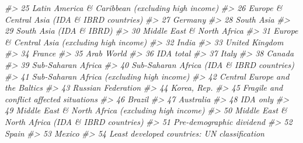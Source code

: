 \documentclass[
  xelatex, ja=standard]{bxjsbook}
\newenvironment{Shaded}{\begin{snugshade}}{\end{snugshade}}
\newcommand{\CommentTok}[1]{\textcolor[rgb]{0.56,0.35,0.01}{\textit{#1}}}
\theoremstyle{definition}
\theoremstyle{definition}
\theoremstyle{definition}
\theoremstyle{definition}
\theoremstyle{remark}
\begin{document}
\begin{Shaded}
\begin{Highlighting}[]
\CommentTok{\#\textgreater{} 25     Latin America \& Caribbean (excluding high income)}
\CommentTok{\#\textgreater{} 26          Europe \& Central Asia (IDA \& IBRD countries)}
\CommentTok{\#\textgreater{} 27                                               Germany}
\CommentTok{\#\textgreater{} 28                                            South Asia}
\CommentTok{\#\textgreater{} 29                               South Asia (IDA \& IBRD)}
\CommentTok{\#\textgreater{} 30                            Middle East \& North Africa}
\CommentTok{\#\textgreater{} 31         Europe \& Central Asia (excluding high income)}
\CommentTok{\#\textgreater{} 32                                                 India}
\CommentTok{\#\textgreater{} 33                                        United Kingdom}
\CommentTok{\#\textgreater{} 34                                                France}
\CommentTok{\#\textgreater{} 35                                            Arab World}
\CommentTok{\#\textgreater{} 36                                             IDA total}
\CommentTok{\#\textgreater{} 37                                                 Italy}
\CommentTok{\#\textgreater{} 38                                                Canada}
\CommentTok{\#\textgreater{} 39                                    Sub{-}Saharan Africa}
\CommentTok{\#\textgreater{} 40             Sub{-}Saharan Africa (IDA \& IBRD countries)}
\CommentTok{\#\textgreater{} 41            Sub{-}Saharan Africa (excluding high income)}
\CommentTok{\#\textgreater{} 42                        Central Europe and the Baltics}
\CommentTok{\#\textgreater{} 43                                    Russian Federation}
\CommentTok{\#\textgreater{} 44                                           Korea, Rep.}
\CommentTok{\#\textgreater{} 45              Fragile and conflict affected situations}
\CommentTok{\#\textgreater{} 46                                                Brazil}
\CommentTok{\#\textgreater{} 47                                             Australia}
\CommentTok{\#\textgreater{} 48                                              IDA only}
\CommentTok{\#\textgreater{} 49    Middle East \& North Africa (excluding high income)}
\CommentTok{\#\textgreater{} 50     Middle East \& North Africa (IDA \& IBRD countries)}
\CommentTok{\#\textgreater{} 51                              Pre{-}demographic dividend}
\CommentTok{\#\textgreater{} 52                                                 Spain}
\CommentTok{\#\textgreater{} 53                                                Mexico}
\CommentTok{\#\textgreater{} 54          Least developed countries: UN classification}

\end{Highlighting}
\end{Shaded}
\end{document}

